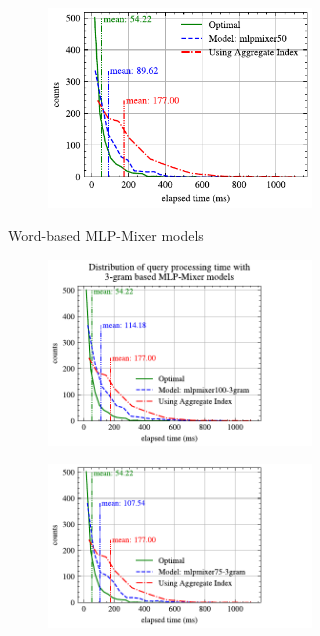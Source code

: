 \begin{figure}[!h]
\begin{subfigure}{0.45\textwidth}
\begin{subfigure}{\textwidth}
			\includegraphics[]{my/graphics/perf_dist_mlpmixer50_B.pdf}
		\end{subfigure}
		\caption{Word-based MLP-Mixer models}
	\end{subfigure}
	\hfill
	\begin{subfigure}{0.45\textwidth}
		\begin{subfigure}{\textwidth}
			\centering
			\includegraphics[]{my/graphics/perf_dist_mlpmixer100_3gram_B.pdf}
		\end{subfigure}
		\vfill
		\begin{subfigure}{\textwidth}
			\centering
			\includegraphics[]{my/graphics/perf_dist_mlpmixer75_3gram_B.pdf}

\end{subfigure}
\end{subfigure}
\end{figure}
